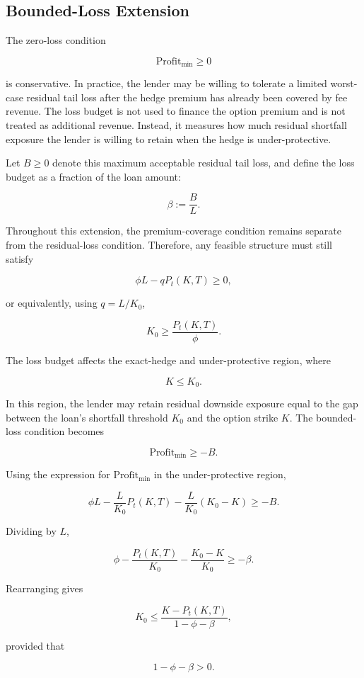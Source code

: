 \documentclass[11pt]{article}
\begin{document}
\subsection{Bounded-Loss Extension}

The zero-loss condition

$$
\text{Profit}_{\min} \geq 0
$$

is conservative. In practice, the lender may be willing to tolerate a limited worst-case residual tail loss after the hedge premium has already been covered by fee revenue. The loss budget is not used to finance the option premium and is not treated as additional revenue. Instead, it measures how much residual shortfall exposure the lender is willing to retain when the hedge is under-protective.

Let $B\geq 0$ denote this maximum acceptable residual tail loss, and define the loss budget as a fraction of the loan amount:

$$
\beta := \frac{B}{L}.
$$

Throughout this extension, the premium-coverage condition remains separate from the residual-loss condition. Therefore, any feasible structure must still satisfy

$$
\phi L - qP_t(K,T) \geq 0,
$$

or equivalently, using $q=L/K_0$,

$$
K_0 \geq \frac{P_t(K,T)}{\phi}.
$$

The loss budget affects the exact-hedge and under-protective region, where

$$
K \leq K_0.
$$

In this region, the lender may retain residual downside exposure equal to the gap between the loan's shortfall threshold $K_0$ and the option strike $K$. The bounded-loss condition becomes

$$
\text{Profit}_{\min} \geq -B.
$$

Using the expression for $\text{Profit}_{\min}$ in the under-protective region,

$$
\phi L
-
\frac{L}{K_0}P_t(K,T)
-
\frac{L}{K_0}(K_0-K)
\geq
-B.
$$

Dividing by $L$,

$$
\phi
-
\frac{P_t(K,T)}{K_0}
-
\frac{K_0-K}{K_0}
\geq
-\beta.
$$

Rearranging gives

$$
K_0
\leq
\frac{K-P_t(K,T)}{1-\phi-\beta},
$$

provided that

$$
1-\phi-\beta>0.
$$
\end{document}
